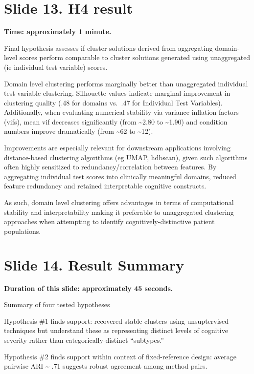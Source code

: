 \documentclass[
  11pt,
]{article}
\begin{document}
\section{Slide 13. H4 result}\label{slide-13.-h4-result}

\textbf{Time: approximately 1 minute.}

Final hypothesis assesses if cluster solutions derived from aggregating
domain-level scores perform comparable to cluster solutions generated
using unaggregated (ie individual test variable) scores.

Domain level clustering performs marginally better than unaggregated
individual test variable clustering. Silhouette values indicate marginal
improvement in clustering quality (.48 for domains vs.~.47 for
Individual Test Variables). Additionally, when evaluating numerical
stability via variance inflation factors (vifs), mean vif decreases
significantly (from \textasciitilde2.80 to \textasciitilde1.90) and
condition numbers improve dramatically (from \textasciitilde62 to
\textasciitilde12).

Improvements are especially relevant for downstream applications
involving distance-based clustering algorithms (eg UMAP, hdbscan), given
such algorithms often highly sensitized to redundancy/correlation
between features. By aggregating individual test scores into clinically
meaningful domains, reduced feature redundancy and retained
interpretable cognitive constructs.

As such, domain level clustering offers advantages in terms of
computational stability and interpretability making it preferable to
unaggregated clustering approaches when attempting to identify
cognitively-distinctive patient populations.

\section{Slide 14. Result Summary}\label{slide-14.-result-summary}

\textbf{Duration of this slide: approximately 45 seconds.}

Summary of four tested hypotheses

Hypothesis \#1 finds support: recovered stable clusters using
unsuptervised techniques but understand these as representing distinct
levels of cognitive severity rather than categorically-distinct
``subtypes.''

Hypothesis \#2 finds support within context of fixed-reference design:
average pairwise ARI \textasciitilde{} .71 suggests robust agreement
among method pairs.
\end{document}
